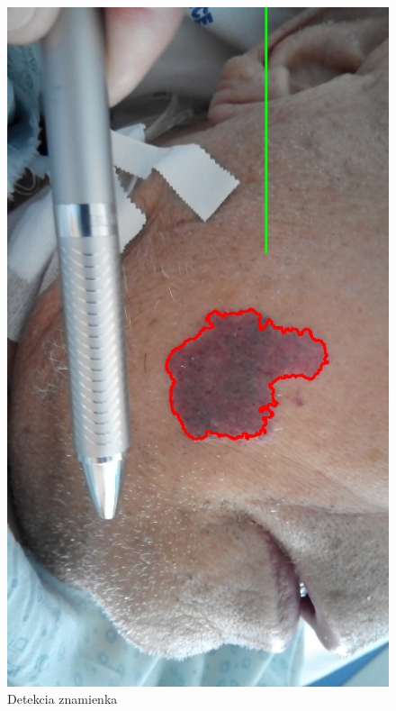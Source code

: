 \begin{figure}[h]
\begin{minipage}{0.4\textwidth}
     \includegraphics[scale=0.35]{fig/3o.jpeg}
      \caption{Detekcia znamienka}
      \label{fig:w3}
   \end{minipage}
\end{figure}